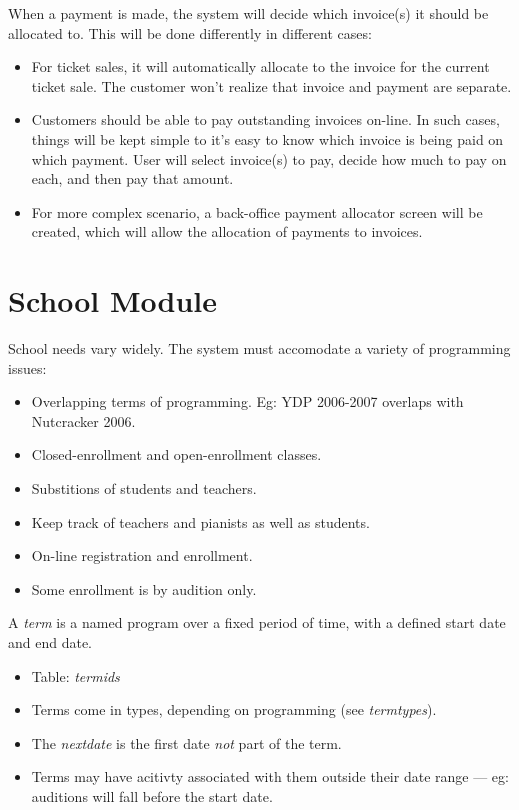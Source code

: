 \documentclass[11pt]{article}
\begin{document}
When a payment is made, the system will decide which invoice(s) it should be allocated to.  This will be done differently in different cases:
 \begin{itemize}
 \item For ticket sales, it will automatically allocate to the invoice for the current ticket sale.  The customer won't realize that invoice and payment are separate.
 \item Customers should be able to pay outstanding invoices on-line.  In such cases, things will be kept simple to it's easy to know which invoice is being paid on which payment.  User will select invoice(s) to pay, decide how much to pay on each, and then pay that amount.
 \item For more complex scenario, a back-office payment allocator screen will be created, which will allow the allocation of payments to invoices.
 \end{itemize}

\section{School Module}

School needs vary widely.  The system must accomodate a variety of programming issues:
 \begin{itemize}
 \item Overlapping terms of programming.  Eg: YDP 2006-2007 overlaps with Nutcracker 2006.
 \item Closed-enrollment and open-enrollment classes.
 \item Substitions of students and teachers.
 \item Keep track of teachers and pianists as well as students.
 \item On-line registration and enrollment.
 \item Some enrollment is by audition only.
 \end{itemize}

A \emph{term} is a named program over a fixed period of time, with a defined start date and end date.
 \begin{itemize}
 \item Table: \emph{termids}
 \item Terms come in types, depending on programming (see \emph{termtypes}).
 \item The \emph{nextdate} is the first date \emph{not} part of the term.
 \item Terms may have acitivty associated with them outside their date range --- eg: auditions will fall before the start date.
 \end{itemize}
\end{document}
